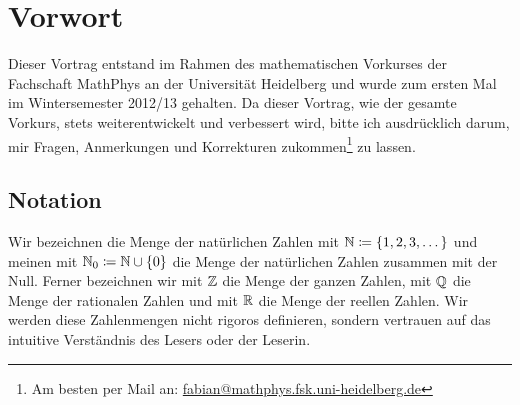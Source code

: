 \section*{Vorwort}

Dieser Vortrag entstand im Rahmen des mathematischen Vorkurses der
Fachschaft MathPhys an der Universität Heidelberg und wurde zum ersten Mal
im Wintersemester 2012/13 gehalten. Da dieser Vortrag, wie der gesamte
Vorkurs, stets weiterentwickelt und verbessert wird, bitte ich ausdrücklich
darum, mir Fragen, Anmerkungen und Korrekturen zukommen\footnote{Am besten
  per Mail an:
  \textsf{\href{mailto:fabian@mathphys.fsk.uni-heidelberg.de}{fabian@mathphys.fsk.uni-heidelberg.de}}}
zu lassen.

\subsection*{Notation}

Wir bezeichnen die Menge der natürlichen Zahlen mit $\mathbb N \coloneqq \{
1,2,3,\dots \}$ und meinen mit $\mathbb N_{0} \coloneqq \mathbb N\cup\{0\}$ die Menge der
natürlichen Zahlen zusammen mit der Null. Ferner bezeichnen wir mit $\mathbb Z$
die Menge der ganzen Zahlen, mit $\mathbb Q$ die Menge der rationalen Zahlen und
mit $\mathbb R$ die Menge der reellen Zahlen. Wir werden diese Zahlenmengen nicht
rigoros definieren, sondern vertrauen auf das intuitive Verständnis des
Lesers oder der Leserin.
